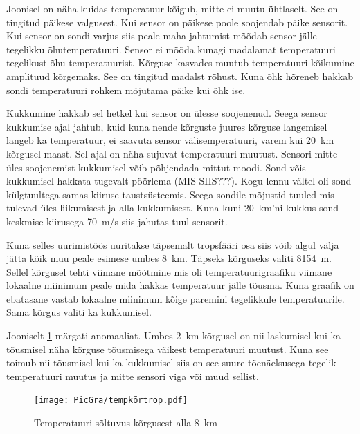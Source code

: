 \documentclass{trkut}%
\begin{document}
Joonisel on näha kuidas temperatuur kõigub, mitte ei muutu ühtlaselt. See on tingitud päikese valgusest. Kui sensor on päikese poole soojendab päike sensorit. Kui sensor on sondi varjus siis peale maha jahtumist mõõdab sensor jälle tegelikku õhutemperatuuri. Sensor ei mõõda kunagi madalamat temperatuuri tegelikust õhu temperatuurist. Kõrguse kasvades muutub temperatuuri kõikumine amplituud kõrgemaks. See on tingitud madalst rõhust. Kuna õhk hõreneb hakkab sondi temperatuuri rohkem mõjutama päike kui õhk ise.

Kukkumine hakkab sel hetkel kui sensor on ülesse soojenenud. Seega sensor kukkumise ajal jahtub, kuid kuna nende kõrguste juures kõrguse langemisel langeb ka temperatuur, ei saavuta sensor välisemperatuuri, varem kui \SI{20}{km} kõrgusel maast. Sel ajal on näha sujuvat temperatuuri muutust. Sensori mitte üles soojenemist kukkumisel võib põhjendada mittut moodi. Sond võis kukkumisel hakkata tugevalt pöörlema (MIS SIIS???). Kogu lennu vältel oli sond külgtuultega samas kiiruse taustsüsteemis. Seega sondile mõjustid tuuled mis tulevad üles liikumisest ja alla kukkumisest. Kuna kuni \SI{20}{km}'ni kukkus sond keskmise kiirusega \SI{70}{m/s} siis jahutas tuul sensorit.

Kuna selles uurimistöös uuritakse täpsemalt tropsfääri osa siis võib algul välja jätta kõik muu peale esimese umbes \SI{8}{km}. Täpseks kõrguseks valiti \SI{8154}{m}. Sellel kõrgusel tehti viimane mõõtmine mis oli temperatuurigraafiku viimane lokaalne miinimum peale mida hakkas temperatuur jälle tõusma. Kuna graafik on ebatasane vastab lokaalne miinimum kõige paremini tegelikkule temperatuurile. Sama kõrgus valiti ka kukkumisel.

Jooniselt \ref{tempkõrtrop} märgati anomaaliat. Umbes \SI{2}{km} kõrgusel on nii laskumisel kui ka tõusmisel näha kõrguse tõusmisega väikest temperatuuri muutust. Kuna see toimub nii tõusmisel kui ka kukkumisel siis on see suure tõenäelsusega tegelik temperatuuri muutus ja mitte sensori viga või muud sellist.
\begin{figure}[h]
	\texttt{[image: PicGra/tempkõrtrop.pdf]}
	\caption{Temperatuuri sõltuvus kõrgusest alla \SI{8}{km}}
	\label{tempkõrtrop}%
\end{figure}
\end{document}
